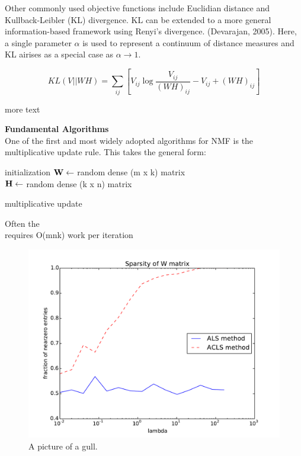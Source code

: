 \documentclass[12pt]{article}
\begin{document}
Other commonly used objective functions include Euclidian distance and Kullback-Leibler (KL) divergence. KL can be extended to a more general information-based framework using Renyi's divergence. (Devarajan, 2005). Here, a single parameter $\alpha$ is used to represent a continuum of distance measures and KL airises as a special case as $\alpha \to 1$. 

$$ KL(V || WH) = \sum_{ij}{[V_{ij} \log{ \frac{V_{ij}}{(WH)_{ij}} - V_{ij} + (WH)_{ij}} ]} $$

more text

\pagebreak 

\textbf{Fundamental Algorithms} \\

One of the first and most widely adopted algorithms for NMF is the multiplicative update rule. This takes the general form: \\


\begin{algorithm}[H]

 initialization\;
$\bf{W} \gets $ random dense (m x k) matrix\\
$\bf{H} \gets $ random dense (k x n) matrix\\
 \caption{multiplicative update}
\end{algorithm} 


Often the \\
requires O(mnk) work per iteration

\begin{figure}[h!]
  \caption{A picture of a gull.}
  \centering
    \includegraphics{ALS_vs_ACLS_sparsity}
\end{figure}
\end{document}
